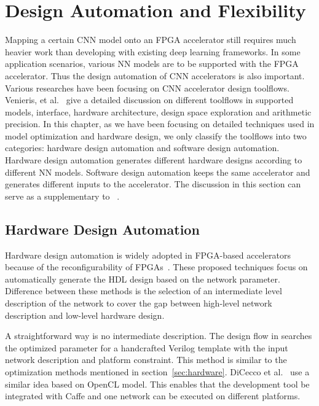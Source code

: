 \section{Design Automation and Flexibility}\label{sec:flexibility}

Mapping a certain CNN model onto an FPGA accelerator still requires much heavier work than developing with existing deep learning frameworks. In some application scenarios, various NN models are to be supported with the FPGA accelerator. Thus the design automation of CNN accelerators is also important. Various researches have been focusing on CNN accelerator design toolflows. Venieris, et al.~\cite{venieris2018toolflows} give a detailed discussion on different toolflows in supported models, interface, hardware architecture, design space exploration and arithmetic precision. In this chapter, as we have been focusing on detailed techniques used in model optimization and hardware design, we only classify the toolflows into two categories: hardware design automation and software design automation. Hardware design automation generates different hardware designs according to different NN models. Software design automation keeps the same accelerator and generates different inputs to the accelerator. The discussion in this section can serve as a supplementary to ~\cite{venieris2018toolflows}. 

\subsection{Hardware Design Automation}
Hardware design automation is widely adopted in FPGA-based accelerators because of the reconfigurability of FPGAs~\cite{venieris2017fpgaconvnet, morcel2017minimalist, ma2017automatic, venieris2017latency, dicecco2016caffeinated, wang2016deepburning, sharma2016high}. These proposed techniques focus on automatically generate the HDL design based on the network parameter. Difference between these methods is the selection of an intermediate level description of the network to cover the gap between high-level network description and low-level hardware design.

A straightforward way is no intermediate description. The design flow in \cite{ma2017automatic} searches the optimized parameter for a handcrafted Verilog template with the input network description and platform constraint. This method is similar to the optimization methods mentioned in section~\ref{sec:hardware}. DiCecco et al.~\cite{dicecco2016caffeinated} use a similar idea based on OpenCL model. This enables that the development tool be integrated with Caffe and one network can be executed on different platforms. 

